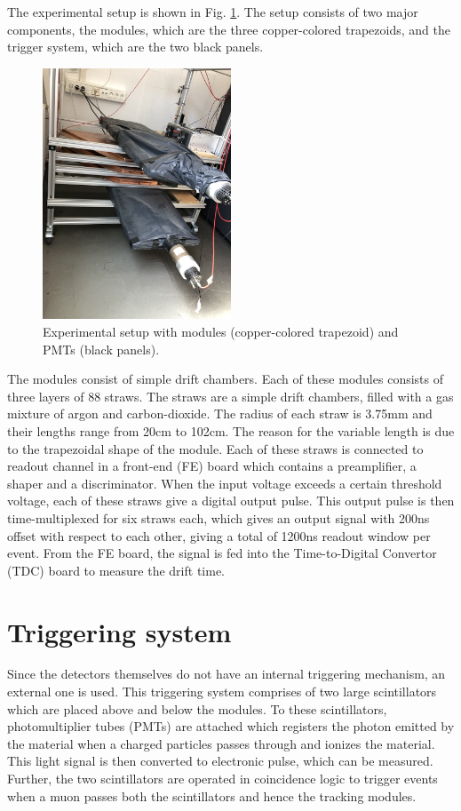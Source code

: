 \documentclass[a4paper]{report}
\numberwithin{equation}{section}
\begin{document}
The experimental setup is shown in Fig. \ref{fig:setup1}. The setup consists of two major components, the modules, which are the three copper-colored trapezoids, and the trigger system, which are the two black panels. 

\begin{figure}[htpb]
    \centering
    \includegraphics[width=0.5\textwidth]{setup1.jpg}
    \caption{Experimental setup with modules (copper-colored trapezoid) and PMTs (black panels).}
    \label{fig:setup1}
\end{figure}	

The modules consist of simple drift chambers. Each of these modules consists of three layers of 88 straws. The straws are a simple drift chambers, filled with a gas mixture of argon and carbon-dioxide. The radius of each straw is 3.75mm and their lengths range from 20cm to 102cm. The reason for the variable length is due to the trapezoidal shape of the module. Each of these straws is connected to readout channel in a front-end (FE) board which contains a preamplifier, a shaper and a discriminator. When the input voltage exceeds a certain threshold voltage, each of these straws give a digital output pulse. This output pulse is then time-multiplexed for six straws each, which gives an output signal with 200ns offset with respect to each other, giving a total of 1200ns readout window per event. From the FE board, the signal is fed into the Time-to-Digital Convertor (TDC) board to measure the drift time.  

\section{Triggering system}
Since the detectors themselves do not have an internal triggering mechanism, an external one is used. This triggering system comprises of two large scintillators which are placed above and below the modules. To these scintillators, photomultiplier tubes (PMTs) are attached which registers the photon emitted by the material when a charged particles passes through and ionizes the material. This light signal is then converted to electronic pulse, which can be measured. Further, the two scintillators are operated in coincidence logic to trigger events when a muon passes both the scintillators and hence the tracking modules. 
\end{document}
